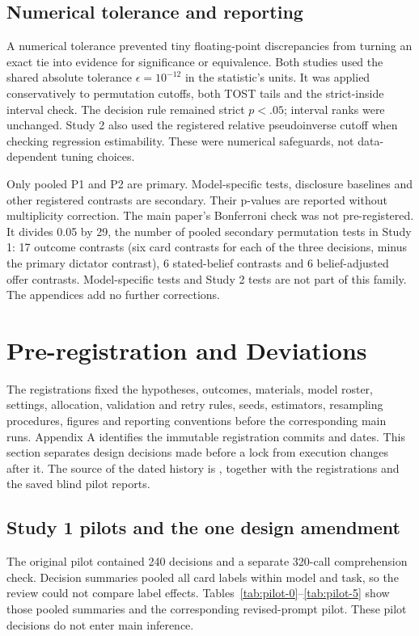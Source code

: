\subsection{Numerical tolerance and reporting}
\label{subapp:numerical-tolerance-and-reporting}
A numerical tolerance prevented tiny floating-point discrepancies from turning an exact tie into evidence for significance or equivalence. Both studies used the shared absolute tolerance $\epsilon=10^{-12}$ in the statistic's units. It was applied conservatively to permutation cutoffs, both TOST tails and the strict-inside interval check. The decision rule remained strict $p<.05$; interval ranks were unchanged. Study 2 also used the registered relative pseudoinverse cutoff when checking regression estimability. These were numerical safeguards, not data-dependent tuning choices.

Only pooled P1 and P2 are primary. Model-specific tests, disclosure baselines and other registered contrasts are secondary. Their p-values are reported without multiplicity correction. The main paper's Bonferroni check was not pre-registered. It divides 0.05 by 29, the number of pooled secondary permutation tests in Study 1: 17 outcome contrasts (six card contrasts for each of the three decisions, minus the primary dictator contrast), 6 stated-belief contrasts and 6 belief-adjusted offer contrasts. Model-specific tests and Study 2 tests are not part of this family. The appendices add no further corrections.

\section{Pre-registration and Deviations}
\label{app:deviations}
The registrations fixed the hypotheses, outcomes, materials, model roster, settings, allocation, validation and retry rules, seeds, estimators, resampling procedures, figures and reporting conventions before the corresponding main runs. Appendix A identifies the immutable registration commits and dates. This section separates design decisions made before a lock from execution changes after it. The source of the dated history is , together with the registrations and the saved blind pilot reports.

\subsection{Study 1 pilots and the one design amendment}
\label{subapp:study-1-pilots-and-the-one-design-amendment}
The original pilot contained 240 decisions and a separate 320-call comprehension check. Decision summaries pooled all card labels within model and task, so the review could not compare label effects. Tables~\ref{tab:pilot-0}--\ref{tab:pilot-5} show those pooled summaries and the corresponding revised-prompt pilot. These pilot decisions do not enter main inference.



